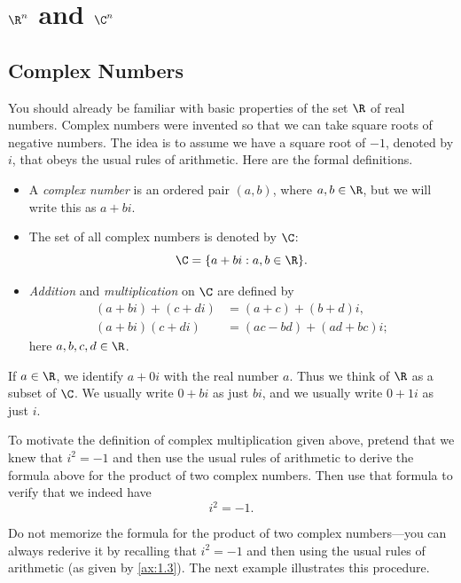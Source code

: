 \section{\texorpdfstring{$\R^n$ and $\C^n$}{R^n and C^n}}

\subsection{Complex Numbers}

You should already be familiar with basic properties of the set $\R$ of real
numbers. Complex numbers were invented so that we can take square roots of
negative numbers. The idea is to assume we have a square root of $-1$, denoted
by $i$, that obeys the usual rules of arithmetic. Here are the formal
definitions.

\begin{definition}\label{ax:1.1}\leavevmode
\begin{itemize}
\item A \emph{complex number} is an ordered pair $(a,b)$, where
  $a,b\in\R$, but we will write this as $a+bi$.
\item The set of all complex numbers is denoted by $\C$:
  \[ \C = \{a+bi : a,b\in\R\}. \]
\item \emph{Addition} and \emph{multiplication} on $\C$ are defined by
  \begin{align*}
    (a+bi)+(c+di) &= (a+c)+(b+d)i,\\
    (a+bi)(c+di)  &= (ac-bd)+(ad+bc)i;
  \end{align*}
  here $a,b,c,d\in\R$.
\end{itemize}
\end{definition}

If $a\in\R$, we identify $a+0i$ with the real number $a$. Thus we think of
$\R$ as a subset of $\C$. We usually write $0+bi$ as just $bi$, and we usually
write $0+1i$ as just $i$.

%
To motivate the definition of complex multiplication given above, pretend that
we knew that $i^2=-1$ and then use the usual rules of arithmetic to derive the
formula above for the product of two complex numbers. Then use that formula to
verify that we indeed have
\[ i^2 = -1. \]

Do not memorize the formula for the product of two complex numbers---you can
always rederive it by recalling that $i^2=-1$ and then using the usual rules of
arithmetic (as given by \ref{ax:1.3}). The next example illustrates this
procedure.

